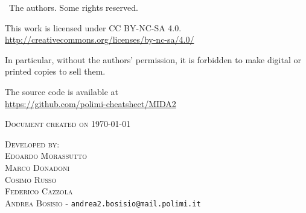 

\textcopyright \ The authors. Some rights reserved.

This work is licensed under CC BY-NC-SA 4.0.\\
\url{http://creativecommons.org/licenses/by-nc-sa/4.0/}

In particular, without the authors' permission, it is forbidden to make digital or printed copies to sell them.

The \latex source code is available at\\
\url{https://github.com/polimi-cheatsheet/MIDA2}


\textsc{Document created on \today}


\textsc{Developed by:}\\
\textsc{Edoardo Morassutto}\\
\textsc{Marco Donadoni}\\
\textsc{Cosimo Russo}\\
\textsc{Federico Cazzola}\\
\textsc{Andrea Bosisio} - \texttt{andrea2.bosisio@mail.polimi.it}

